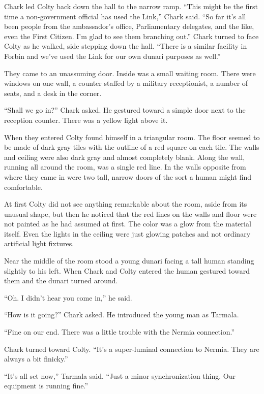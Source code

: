 Chark led Colty back down the hall to the narrow ramp. ``This might be the first time a
non-government official has used the Link,'' Chark said. ``So far it's all been people from the
ambassador's office, Parliamentary delegates, and the like, even the First Citizen. I'm glad to
see them branching out.'' Chark turned to face Colty as he walked, side stepping down the hall.
``There is a similar facility in Forbin and we've used the Link for our own dunari purposes as
well.''

They came to an unassuming door. Inside was a small waiting room. There were windows on one
wall, a counter staffed by a military receptionist, a number of seats, and a desk in the corner.

``Shall we go in?'' Chark asked. He gestured toward a simple door next to the reception counter.
There was a yellow light above it.

When they entered Colty found himself in a triangular room. The floor seemed to be made of dark
gray tiles with the outline of a red square on each tile. The walls and ceiling were also dark
gray and almost completely blank. Along the wall, running all around the room, was a single red
line. In the walls opposite from where they came in were two tall, narrow doors of the sort a
human might find comfortable.

At first Colty did not see anything remarkable about the room, aside from its unusual shape, but
then he noticed that the red lines on the walls and floor were not painted as he had assumed at
first. The color was a glow from the material itself. Even the lights in the ceiling were just
glowing patches and not ordinary artificial light fixtures.

Near the middle of the room stood a young dunari facing a tall human standing slightly to his
left. When Chark and Colty entered the human gestured toward them and the dunari turned around.

``Oh. I didn't hear you come in,'' he said.

``How is it going?'' Chark asked. He introduced the young man as Tarmala.

``Fine on our end. There was a little trouble with the Nermia connection.''

Chark turned toward Colty. ``It's a super-luminal connection to Nermia. They are always a bit
finicky.''

``It's all set now,'' Tarmala said. ``Just a minor synchronization thing. Our equipment is
running fine.''

